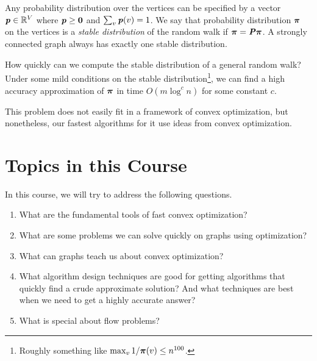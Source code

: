 Any probability distribution over the vertices can be specified by a vector
$\boldsymbol{\mathit{p}} \in \mathbb{R}^V$ where $\boldsymbol{\mathit{p}} \geq
\boldsymbol{0}$ and $\sum_v \boldsymbol{\mathit{p}}(v) = 1$.
We say that probability distribution $\boldsymbol{\pi}$ on the vertices is a \emph{stable distribution} of the random walk
if $\boldsymbol{\pi} = \boldsymbol{\mathit{P}} \boldsymbol{\pi}$.
A strongly connected graph always has exactly one stable distribution.

How quickly can we compute the stable distribution of a general random
walk? Under some mild conditions on the stable
distribution\footnote{Roughly something like $\max_{v} 1/\boldsymbol{\pi}(v) \leq n^{100}$.}, we can find
a high accuracy approximation of $\boldsymbol{\pi}$ in time $O(m \log^cn )$ for
some constant $c$.

This problem does not easily fit in a framework of convex
optimization, but nonetheless, our fastest algorithms for it use ideas
from convex optimization.

\section*{Topics in this Course}
In this course, we will try to address the following questions.
\begin{enumerate}
\item What are the fundamental tools of fast convex optimization?
\item What are some problems we can solve quickly on graphs using optimization?
\item What can graphs teach us about convex optimization?
\item What algorithm design techniques are good for getting algorithms
  that quickly find a crude approximate solution? And what techniques
  are best when we need to get a highly accurate answer?
\item What is special about flow problems?
\end{enumerate}


